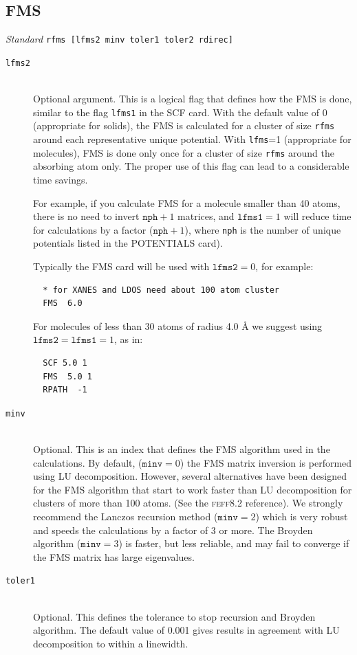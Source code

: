 \documentclass[11pt,oneside]{report} %
\renewcommand{\htmlref}[2]{\hyperlink{#2}{#1}}
\newcommand{\program}[1]{\textsc{#1}}
\newcommand{\feff}{\program{feff}}
\newenvironment{Card}[4]%
      {\vspace{3ex}%
        \subsection{#1}
        \quad\textsl{#3}\newline
        \quad\texttt{#2}\newline%
        \label{card:#4}\\}
      {}
\renewcommand{\htmlref}[2]{{#1}} %
\begin{document}
\begin{Card}{FMS}{rfms  [lfms2 minv toler1 toler2 rdirec]}{Standard}{fms}
\begin{description}
  \item[\texttt{lfms2}]\hfill\\ Optional argument. This is a logical 
  flag that defines how the FMS is done, similar to the flag \texttt{lfms1} 
  in the \htmlref{SCF}{card:scf} card. With the default value of 0 (appropriate 
  for solids), the FMS is calculated for a cluster of size \texttt{rfms}
  around each representative unique potential. With \texttt{lfms}=1
  (appropriate for molecules), FMS is done only once for a cluster of 
  size \texttt{rfms} around the absorbing atom only. The proper use of this 
  flag can lead to a considerable time savings.

  For example, if you calculate FMS for a molecule smaller than 40
  atoms, there is no need to invert $\mathtt{nph}+1$ matrices, and
  $\mathtt{lfms1}=1$ will reduce time for calculations by a factor
  ($\mathtt{nph}+1$), where \texttt{nph} is the number of unique
  potentials listed in the \htmlref{POTENTIALS}{card:pot} card).

  Typically the FMS card will be used with $\mathtt{lfms2}=0$, for example:

\begin{verbatim}
  * for XANES and LDOS need about 100 atom cluster
  FMS  6.0
\end{verbatim}


  For molecules of less than 30 atoms of radius 4.0 {\AA} we suggest
  using $\mathtt{lfms2}=\mathtt{lfms1}=1$, as in:
\begin{verbatim}
  SCF 5.0 1 
  FMS  5.0 1
  RPATH  -1
\end{verbatim}

  \item[\texttt{minv}]\hfill\\ Optional. This is an index that defines 
the FMS algorithm used in the calculations. By default, ($\mathtt{minv}=0$)
 the FMS matrix inversion is performed using LU decomposition. However,
several alternatives have been designed for the FMS algorithm that start to
work faster than LU decomposition for clusters of more than 100 atoms.
(See the {\feff}8.2 reference).
We strongly recommend the Lanczos recursion method ($\mathtt{minv}=2$) which is very robust
and speeds the calculations by a factor of 3 or more.
The Broyden algorithm ($\mathtt{minv}=3$) is faster, but less reliable, and 
may fail to converge if the FMS matrix has large eigenvalues.

  \item[\texttt{toler1}]\hfill\\ Optional. This defines the tolerance to stop
recursion and Broyden algorithm. The default value of 0.001 gives results
in agreement with LU decomposition to within a linewidth. 


\end{description}
\end{Card}
\end{document}
